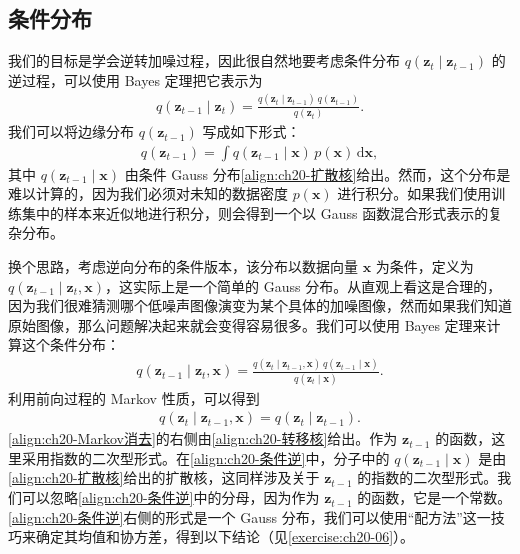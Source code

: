 \documentclass[../../main.tex]{subfiles}
\begin{document}
\subsection{条件分布}\label{subsection:ch20-条件分布}

我们的目标是学会逆转加噪过程，因此很自然地要考虑条件分布 $q(\bm{z}_t\mid\bm{z}_{t-1})$ 的逆过程，可以使用 Bayes 定理把它表示为
\begin{align}
q(\bm{z}_{t-1}\mid\bm{z}_t)=\frac{q(\bm{z}_t\mid\bm{z}_{t-1})\,q(\bm{z}_{t-1})}{q(\bm{z}_t)}.
\label{align:ch20-Bayes逆}
\end{align}
我们可以将边缘分布 $q(\bm{z}_{t-1})$ 写成如下形式：
\begin{align}
q(\bm{z}_{t-1})=\int q(\bm{z}_{t-1}\mid\bm{x})\,p(\bm{x})\,\mathrm{d}\bm{x},
\label{align:ch20-边缘z}
\end{align}
其中 $q(\bm{z}_{t-1}\mid\bm{x})$ 由条件 Gauss 分布\eqref{align:ch20-扩散核}给出。然而，这个分布是难以计算的，因为我们必须对未知的数据密度 $p(\bm{x})$ 进行积分。如果我们使用训练集中的样本来近似地进行积分，则会得到一个以 Gauss 函数混合形式表示的复杂分布。

换个思路，考虑逆向分布的条件版本，该分布以数据向量 $\bm{x}$ 为条件，定义为 $q(\bm{z}_{t-1}\mid\bm{z}_t,\bm{x})$，这实际上是一个简单的 Gauss 分布。从直观上看这是合理的，因为我们很难猜测哪个低噪声图像演变为某个具体的加噪图像，然而如果我们知道原始图像，那么问题解决起来就会变得容易很多。我们可以使用 Bayes 定理来计算这个条件分布：
\begin{align}
q(\bm{z}_{t-1}\mid\bm{z}_t,\bm{x})=\frac{q(\bm{z}_t\mid\bm{z}_{t-1},\bm{x})\,q(\bm{z}_{t-1}\mid\bm{x})}{q(\bm{z}_t\mid\bm{x})}.
\label{align:ch20-条件逆}
\end{align}
利用前向过程的 Markov 性质，可以得到
\begin{align}
q(\bm{z}_t\mid\bm{z}_{t-1},\bm{x})=q(\bm{z}_t\mid\bm{z}_{t-1}).
\label{align:ch20-Markov消去}
\end{align}
\eqref{align:ch20-Markov消去}的右侧由\eqref{align:ch20-转移核}给出。作为 $\bm{z}_{t-1}$ 的函数，这里采用指数的二次型形式。在\eqref{align:ch20-条件逆}中，分子中的 $q(\bm{z}_{t-1}\mid\bm{x})$ 是由\eqref{align:ch20-扩散核}给出的扩散核，这同样涉及关于 $\bm{z}_{t-1}$ 的指数的二次型形式。我们可以忽略\eqref{align:ch20-条件逆}中的分母，因为作为 $\bm{z}_{t-1}$ 的函数，它是一个常数。\eqref{align:ch20-条件逆}右侧的形式是一个 Gauss 分布，我们可以使用“配方法”这一技巧来确定其均值和协方差，得到以下结论（见\cref{exercise:ch20-06}）。
\end{document}
